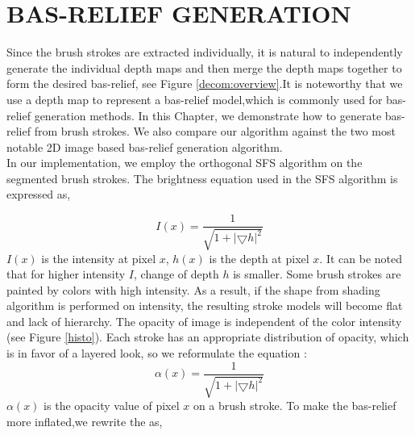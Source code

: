 \chapter{BAS-RELIEF GENERATION}
Since the brush strokes are extracted individually, it is natural to independently generate the individual depth maps and then merge the depth maps together to form the desired bas-relief, see Figure \ref{decom:overview}.It is noteworthy that we use a depth map to represent a bas-relief model,which is commonly used for bas-relief generation methods.   In this Chapter, we demonstrate how to generate bas-relief from brush strokes. We also compare our algorithm against the two most notable 2D image based bas-relief generation algorithm. \\
In our implementation, we employ the orthogonal SFS \cite{prados2004unifying} algorithm on the segmented brush strokes. The brightness equation used in the SFS algorithm is expressed as,

\begin{equation*}
I(x)=\frac{1}{\sqrt{1+\lvert \bigtriangledown h \rvert ^2}}
\end{equation*}
$I(x)$ is the intensity at pixel $x$, $h(x)$ is the depth at pixel $x$. It can be noted that for higher intensity $I$, change of depth $h$ is smaller. Some brush strokes are painted by colors with high intensity. As a result, if the shape from shading algorithm is performed on intensity, the resulting stroke models will become flat and lack of hierarchy. The opacity of image is independent of the color intensity (see Figure \ref{histo}). Each stroke has an appropriate distribution of opacity, which is in favor of a layered look, so we reformulate the equation : 
\begin{equation*}
\alpha(x)=\frac{1}{\sqrt{1+\lvert \bigtriangledown h \rvert ^2}}
\end{equation*}
$\alpha(x)$ is the opacity value of pixel $x$ on a brush stroke. 
To make the bas-relief more inflated,we rewrite the as,

